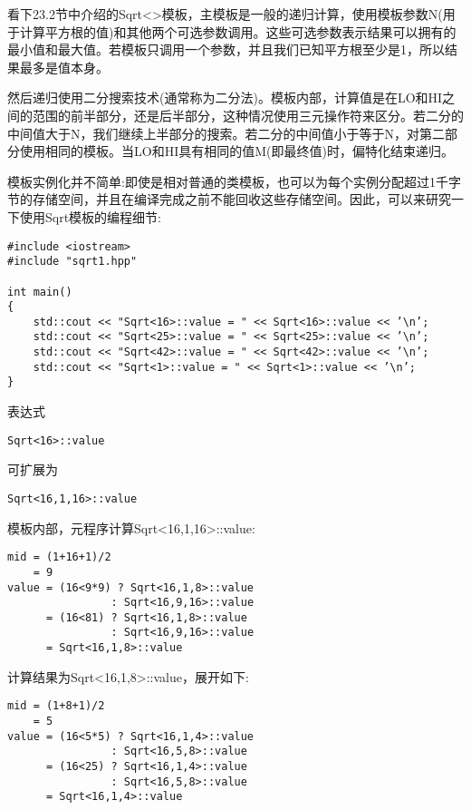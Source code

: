 
看下23.2节中介绍的Sqrt<>模板，主模板是一般的递归计算，使用模板参数N(用于计算平方根的值)和其他两个可选参数调用。这些可选参数表示结果可以拥有的最小值和最大值。若模板只调用一个参数，并且我们已知平方根至少是1，所以结果最多是值本身。

然后递归使用二分搜索技术(通常称为二分法)。模板内部，计算值是在LO和HI之间的范围的前半部分，还是后半部分，这种情况使用三元操作符来区分。若二分的中间值大于N，我们继续上半部分的搜索。若二分的中间值小于等于N，对第二部分使用相同的模板。当LO和HI具有相同的值M(即最终值)时，偏特化结束递归。

模板实例化并不简单:即使是相对普通的类模板，也可以为每个实例分配超过1千字节的存储空间，并且在编译完成之前不能回收这些存储空间。因此，可以来研究一下使用Sqrt模板的编程细节:

\begin{lstlisting}[style=styleCXX]
#include <iostream>
#include "sqrt1.hpp"

int main()
{
	std::cout << "Sqrt<16>::value = " << Sqrt<16>::value << ’\n’;
	std::cout << "Sqrt<25>::value = " << Sqrt<25>::value << ’\n’;
	std::cout << "Sqrt<42>::value = " << Sqrt<42>::value << ’\n’;
	std::cout << "Sqrt<1>::value = " << Sqrt<1>::value << ’\n’;
}
\end{lstlisting}

表达式

\begin{lstlisting}[style=styleCXX]
Sqrt<16>::value
\end{lstlisting}

可扩展为

\begin{lstlisting}[style=styleCXX]
Sqrt<16,1,16>::value
\end{lstlisting}

模板内部，元程序计算Sqrt<16,1,16>::value:

\begin{lstlisting}[style=styleCXX]
mid = (1+16+1)/2
	= 9
value = (16<9*9) ? Sqrt<16,1,8>::value
				: Sqrt<16,9,16>::value
	  = (16<81) ? Sqrt<16,1,8>::value
				: Sqrt<16,9,16>::value
	  = Sqrt<16,1,8>::value
\end{lstlisting}

计算结果为Sqrt<16,1,8>::value，展开如下:

\begin{lstlisting}[style=styleCXX]
mid = (1+8+1)/2
	= 5
value = (16<5*5) ? Sqrt<16,1,4>::value
				: Sqrt<16,5,8>::value
	  = (16<25) ? Sqrt<16,1,4>::value
				: Sqrt<16,5,8>::value
	  = Sqrt<16,1,4>::value
\end{lstlisting}

